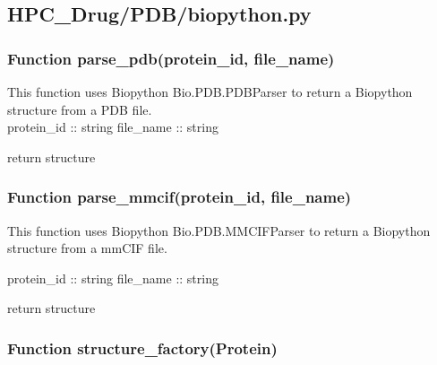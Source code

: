 

\subsection{HPC\_Drug/PDB/biopython.py}

    \subsubsection{Function parse\_pdb(protein\_id, file\_name)}

        This function uses Biopython Bio.PDB.PDBParser to return a Biopython structure from a PDB file.\\

        protein\_id :: string
        file\_name :: string
        
        return structure

    
    \subsubsection{Function parse\_mmcif(protein\_id, file\_name)}

        This function uses Biopython Bio.PDB.MMCIFParser to
        return a Biopython structure from a mmCIF file.

        protein\_id :: string
        file\_name :: string 
        
        return structure

    \subsubsection{Function structure\_factory(Protein)}
        
